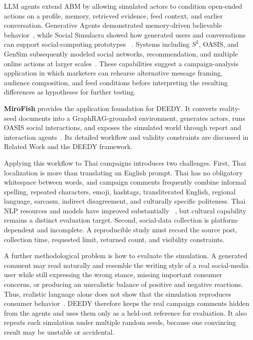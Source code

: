 \documentclass[conference]{IEEEtran}
\begin{document}
LLM agents extend ABM by allowing simulated actors to condition open-ended
actions on a profile, memory, retrieved evidence, feed context, and earlier
conversation. Generative Agents demonstrated memory-driven believable
behavior~\cite{park2023generative}, while Social Simulacra showed how generated
users and conversations can support social-computing prototypes
~\cite{park2022social}. Systems including $S^3$, OASIS, and GenSim subsequently
modeled social networks, recommendation, and multiple online actions at larger
scales~\cite{gao2023s3,yang2024oasis,tang2025gensim}. These capabilities suggest
a campaign-analysis application in which marketers can rehearse alternative
message framing, audience composition, and feed conditions before interpreting
the resulting differences as hypotheses for further testing.

\textbf{MiroFish} provides the application foundation for DEEDY. It converts
reality-seed documents into a GraphRAG-grounded environment, generates actors,
runs OASIS social interactions, and exposes the simulated world through report
and interaction agents~\cite{mirofish2026}. Its detailed workflow and validity
constraints are discussed in Related Work and the DEEDY framework.

Applying this workflow to Thai campaigns introduces two challenges. First,
Thai localization is more than translating an English prompt. Thai has no
obligatory whitespace between words, and campaign comments frequently combine
informal spelling, repeated characters, emoji, hashtags, transliterated
English, regional language, sarcasm, indirect disagreement, and culturally
specific politeness. Thai NLP resources and models have improved substantially
~\cite{arreerard2022survey}, but cultural capability remains a distinct
evaluation target. Second, social-data collection is platform-dependent and
incomplete. A reproducible study must record the source post, collection time,
requested limit, returned count, and visibility constraints.

A further methodological problem is how to evaluate the simulation. A
generated comment may read naturally and resemble the writing style of a real
social-media user while still expressing the wrong stance, missing important
consumer concerns, or producing an unrealistic balance of positive and
negative reactions. Thus, realistic language alone does not show that the
simulation reproduces consumer behavior~\cite{argyle2023out,
mooney2025coherent,schwager2026conditioned}. DEEDY therefore keeps the real
campaign comments hidden from the agents and uses them only as a held-out
reference for evaluation. It also repeats each simulation under multiple
random seeds, because one convincing result may be unstable or accidental.
\end{document}
